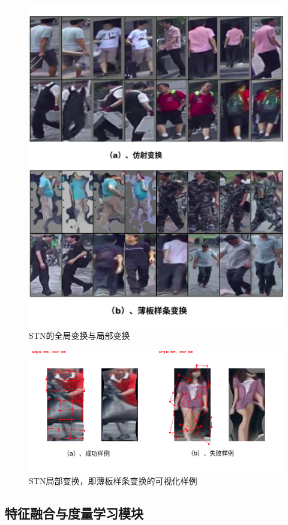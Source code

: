 \begin{figure}
	\centering 
	\includegraphics[width=.8\textwidth]{fig/stn1.png}
	\caption{STN的全局变换与局部变换} \label{fig:stn-lc-gl}
\end{figure}

\begin{figure}
	\centering
	\includegraphics[width=\textwidth]{fig/2018-05-19-23-06-12.png}
	\caption{STN局部变换，即薄板样条变换的可视化样例} \label{fig:stn-lc-fail}
\end{figure}

\subsection{特征融合与度量学习模块}


